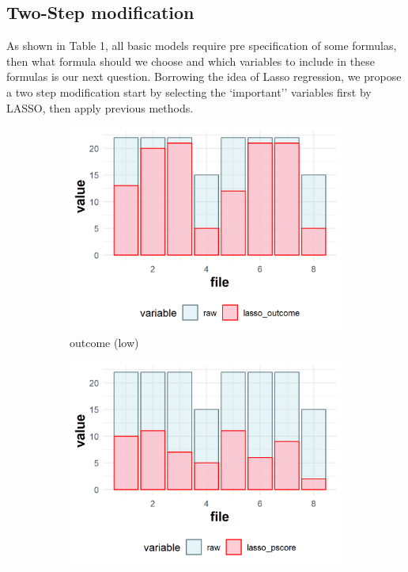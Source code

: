 \documentclass[11pt, oneside]{article}
\begin{document}
\subsection{Two-Step modification}
As shown in Table 1, all basic models require pre specification of some formulas, then what formula should we choose and which variables to include in these formulas is our next question. Borrowing the idea of Lasso regression, we propose a two step modification start by selecting the `important'' variables first by LASSO, then apply previous methods. 
\begin{figure}[h]
  \begin{subfigure}{0.24\textwidth}
    \includegraphics[width=\textwidth]{../plot/lasso_outcome.png}
    \caption{outcome (low)}
  \end{subfigure}
  \begin{subfigure}{0.24\textwidth}
    \includegraphics[width=\textwidth]{../plot/lasso_pscore.png}

\end{subfigure}
\end{figure}
\end{document}
